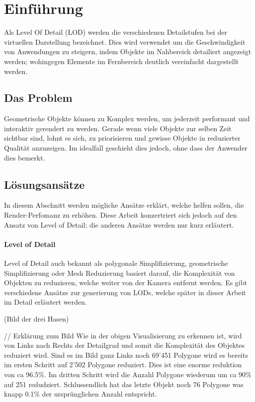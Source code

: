 \section{Einführung}
Als Level Of Detail (LOD) werden die verschiedenen Detailstufen bei der virtuellen Darstellung bezeichnet.
Dies wird verwendet um die Geschwindigkeit von Anwendungen zu steigern, indem Objekte im Nahbereich detailiert angezeigt werden; wohingegen Elemente im Fernbereich deutlich vereinfacht dargestellt werden.

\subsection{Das Problem}
Geometrische Objekte können zu Komplex werden, um jederzeit performant und interaktiv gerendert zu werden.
Gerade wenn viele Objekte zur selben Zeit sichtbar sind, lohnt es sich, zu priorisieren und gewisse Objekte in reduzierter Qualität anzuzeigen.
Im idealfall geschieht dies jedoch, ohne dass der Anwender dies bemerkt.

\subsection{Lösungsansätze}
In diesem Abschnitt werden mögliche Ansätze erklärt, welche helfen sollen, die Render-Perfomanz zu erhöhen. Diese Arbeit konzertriert sich jedoch auf den Ansatz von Level of Detail; die anderen Ansätze werden nur kurz erläutert.

\paragraph{Level of Detail}
Level of Detail auch bekannt als polygonale Simplifizierung, geometrische Simplifizierung oder Mesh Reduzierung basiert darauf, die Komplexität von Objekten zu reduzieren, welche weiter von der Kamera entfernt werden. Es gibt verschiedene Ansätze zur generierung von LODs, welche später in dieser Arbeit im Detail erläutert werden.


(Bild der drei Hasen)

// Erklärung zum Bild
Wie in der obigen Visualisierung zu erkennen ist, wird von Links nach Rechts der Detailgrad und somit die Komplexität des Objektes reduziert wird. Sind es im Bild ganz Links noch 69'451 Polygone wird es bereits im ersten Schritt auf 2'502 Polygone reduziert. Dies ist eine enorme reduktion von ca 96.5\%. Im dritten Schritt wird die Anzahl Polygone wiederum um ca 90\% auf 251 redudziert. Schlussendlich hat das letzte Objekt noch 76 Polygone was knapp 0.1\% der ursprünglichen Anzahl entspricht.

